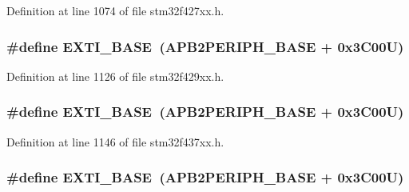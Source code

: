 Definition at line 1074 of file stm32f427xx.\+h.

\subsubsection[{\texorpdfstring{E\+X\+T\+I\+\_\+\+B\+A\+SE}{EXTI_BASE}}]{\setlength{\rightskip}{0pt plus 5cm}\#define E\+X\+T\+I\+\_\+\+B\+A\+SE~({\bf A\+P\+B2\+P\+E\+R\+I\+P\+H\+\_\+\+B\+A\+SE} + 0x3\+C00\+U)}\hypertarget{group___peripheral__memory__map_ga87371508b3bcdcd98cd1ec629be29061}{}\label{group___peripheral__memory__map_ga87371508b3bcdcd98cd1ec629be29061}


Definition at line 1126 of file stm32f429xx.\+h.

\subsubsection[{\texorpdfstring{E\+X\+T\+I\+\_\+\+B\+A\+SE}{EXTI_BASE}}]{\setlength{\rightskip}{0pt plus 5cm}\#define E\+X\+T\+I\+\_\+\+B\+A\+SE~({\bf A\+P\+B2\+P\+E\+R\+I\+P\+H\+\_\+\+B\+A\+SE} + 0x3\+C00\+U)}\hypertarget{group___peripheral__memory__map_ga87371508b3bcdcd98cd1ec629be29061}{}\label{group___peripheral__memory__map_ga87371508b3bcdcd98cd1ec629be29061}


Definition at line 1146 of file stm32f437xx.\+h.

\subsubsection[{\texorpdfstring{E\+X\+T\+I\+\_\+\+B\+A\+SE}{EXTI_BASE}}]{\setlength{\rightskip}{0pt plus 5cm}\#define E\+X\+T\+I\+\_\+\+B\+A\+SE~({\bf A\+P\+B2\+P\+E\+R\+I\+P\+H\+\_\+\+B\+A\+SE} + 0x3\+C00\+U)}\hypertarget{group___peripheral__memory__map_ga87371508b3bcdcd98cd1ec629be29061}{}\label{group___peripheral__memory__map_ga87371508b3bcdcd98cd1ec629be29061}


